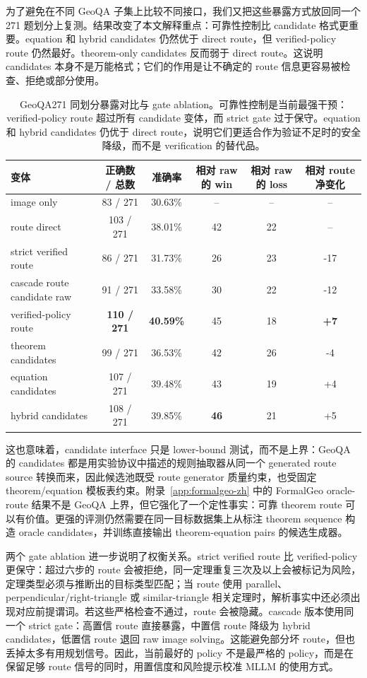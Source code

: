 \documentclass[UTF8,11pt,fontset=fandol]{ctexart}
\begin{document}
为了避免在不同 GeoQA 子集上比较不同接口，我们又把这些暴露方式放回同一个 271 题划分上复测。结果改变了本文解释重点：可靠性控制比 candidate 格式更重要。equation 和 hybrid candidates 仍然优于 direct route，但 verified-policy route 仍然最好。theorem-only candidates 反而弱于 direct route。这说明 candidates 本身不是万能格式；它们的作用是让不确定的 route 信息更容易被检查、拒绝或部分使用。

\begin{table}[t]
\centering
\caption{GeoQA271 同划分暴露对比与 gate ablation。可靠性控制是当前最强干预：verified-policy route 超过所有 candidate 变体，而 strict gate 过于保守。equation 和 hybrid candidates 仍优于 direct route，说明它们更适合作为验证不足时的安全降级，而不是 verification 的替代品。}
\label{tab:geoqa271-exposure-zh}
\scriptsize
\setlength{\tabcolsep}{3pt}
\begin{tabular}{lccccc}
\toprule
变体 & 正确数 / 总数 & 准确率 & 相对 raw 的 win & 相对 raw 的 loss & 相对 route 净变化 \\
\midrule
image only & 83 / 271 & 30.63\% & -- & -- & -- \\
route direct & 103 / 271 & 38.01\% & 42 & 22 & -- \\
strict verified route & 86 / 271 & 31.73\% & 26 & 23 & -17 \\
cascade route candidate raw & 91 / 271 & 33.58\% & 30 & 22 & -12 \\
verified-policy route & \textbf{110 / 271} & \textbf{40.59\%} & 45 & 18 & \textbf{+7} \\
theorem candidates & 99 / 271 & 36.53\% & 42 & 26 & -4 \\
equation candidates & 107 / 271 & 39.48\% & 43 & 19 & +4 \\
hybrid candidates & 108 / 271 & 39.85\% & \textbf{46} & 21 & +5 \\
\bottomrule
\end{tabular}
\end{table}

这也意味着，candidate interface 只是 lower-bound 测试，而不是上界：GeoQA 的 candidates 都是用实验协议中描述的规则抽取器从同一个 generated route source 转换而来，因此候选池既受 route generator 质量约束，也受固定 theorem/equation 模板表约束。附录~\ref{app:formalgeo-zh} 中的 FormalGeo oracle-route 结果不是 GeoQA 上界，但它强化了一个定性事实：可靠 theorem route 可以有价值。更强的评测仍然需要在同一目标数据集上从标注 theorem sequence 构造 oracle candidates，并训练直接输出 theorem-equation pairs 的候选生成器。

两个 gate ablation 进一步说明了权衡关系。strict verified route 比 verified-policy 更保守：超过六步的 route 会被拒绝，同一定理重复三次及以上会被标记为风险，定理类型必须与推断出的目标类型匹配；当 route 使用 parallel、perpendicular/right-triangle 或 similar-triangle 相关定理时，解析事实中还必须出现对应前提谓词。若这些严格检查不通过，route 会被隐藏。cascade 版本使用同一个 strict gate：高置信 route 直接暴露，中置信 route 降级为 hybrid candidates，低置信 route 退回 raw image solving。这能避免部分坏 route，但也丢掉太多有用规划信号。因此，当前最好的 policy 不是最严格的 policy，而是在保留足够 route 信号的同时，用置信度和风险提示校准 MLLM 的使用方式。
\end{document}
